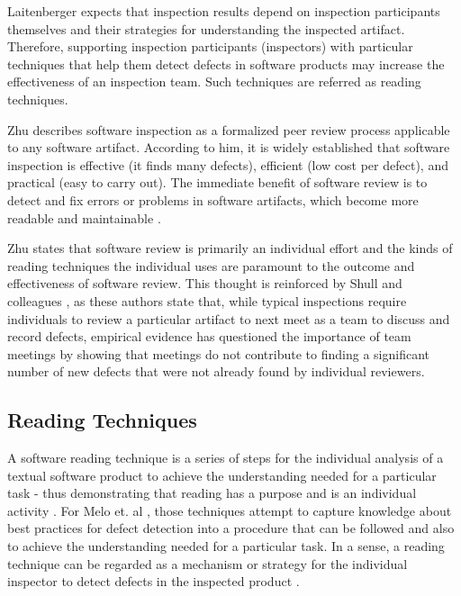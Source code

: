 Laitenberger \cite{Laitenberger_2002} expects that inspection results depend on inspection participants themselves and their strategies for understanding the inspected artifact. Therefore, supporting inspection participants (inspectors) with particular techniques that help them detect defects in software products may increase the effectiveness of an inspection team. Such techniques are referred as reading techniques. 

Zhu \cite{Zhu_2016} describes software inspection as a formalized peer review process applicable to any software artifact. According to him, it is widely established that software inspection is effective (it finds many defects), efficient (low cost per defect), and practical (easy to carry out). The immediate benefit of software review is to detect and fix errors or problems in software artifacts, which become more readable and maintainable \cite{Zhu_2016}.

Zhu \cite{Zhu_2016} states that software review is primarily an individual effort and the kinds of reading techniques the individual uses are paramount to the outcome and effectiveness of software review. This thought is reinforced by Shull and colleagues \cite{Shull_et_dot_al_2003}, as these authors state that, while typical inspections require individuals to review a particular artifact to next meet as a team to discuss and record defects, empirical evidence has questioned the importance of team meetings by showing that meetings do not contribute to finding a significant number of new defects that were not already found by individual reviewers. 

\subsection{Reading Techniques}

A software reading technique is a series of steps for the individual analysis of a textual software product to achieve the understanding needed for a particular task - thus demonstrating that reading has a purpose and is an individual activity \cite{Zhu_2016} \cite{Shull_et_dot_al_2003}. For Melo et. al \cite{Melo_et_dot_al_2001}, those techniques attempt to capture knowledge about best practices for defect detection into a procedure that can be followed and also to achieve the understanding needed for a particular task. In a sense, a reading technique can be regarded as a mechanism or strategy for the individual inspector to detect defects in the inspected product \cite{Laitenberger_2002}.


